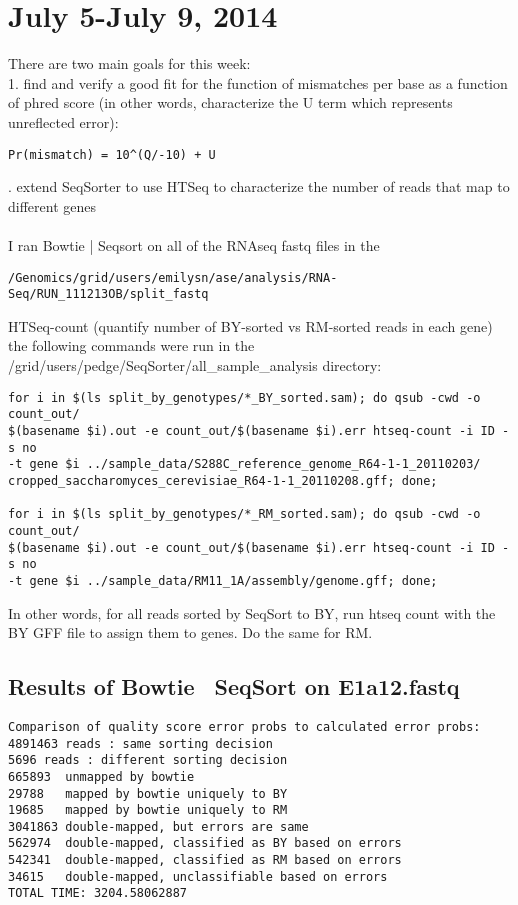 \documentclass[11pt]{article}
\begin{document}
\section*{July 5-July 9, 2014}
There are two main goals for this week: \\
1. find and verify a good fit for the function of mismatches per base as a function of phred score (in other words, characterize the U term which represents unreflected error):
\begin{verbatim}
Pr(mismatch) = 10^(Q/-10) + U
\end{verbatim}
. extend SeqSorter to use HTSeq to characterize the number of reads that map to different genes
\\
\smallskip
\\
\noindent
I ran Bowtie | Seqsort on all of the RNAseq fastq files in the
\begin{verbatim}
/Genomics/grid/users/emilysn/ase/analysis/RNA-Seq/RUN_111213OB/split_fastq
\end{verbatim}
HTSeq-count (quantify number of BY-sorted vs RM-sorted reads in each gene)\newline
the following commands were run in the /grid/users/pedge/SeqSorter/all\_sample\_analysis directory:
\begin{verbatim}
for i in $(ls split_by_genotypes/*_BY_sorted.sam); do qsub -cwd -o count_out/
$(basename $i).out -e count_out/$(basename $i).err htseq-count -i ID -s no
-t gene $i ../sample_data/S288C_reference_genome_R64-1-1_20110203/
cropped_saccharomyces_cerevisiae_R64-1-1_20110208.gff; done;

for i in $(ls split_by_genotypes/*_RM_sorted.sam); do qsub -cwd -o count_out/
$(basename $i).out -e count_out/$(basename $i).err htseq-count -i ID -s no
-t gene $i ../sample_data/RM11_1A/assembly/genome.gff; done;
\end{verbatim}
\noindent
In other words, for all reads sorted by SeqSort to BY, run htseq count with the BY GFF file to assign them to genes. Do the same for RM.
\noindent
\pagebreak
\subsection*{Results of Bowtie \textbar \ SeqSort on E1a12.fastq}
\begin{verbatim}
Comparison of quality score error probs to calculated error probs:
4891463 reads : same sorting decision
5696 reads : different sorting decision
665893	unmapped by bowtie
29788	mapped by bowtie uniquely to BY
19685	mapped by bowtie uniquely to RM
3041863	double-mapped, but errors are same
562974	double-mapped, classified as BY based on errors
542341	double-mapped, classified as RM based on errors
34615	double-mapped, unclassifiable based on errors
TOTAL TIME: 3204.58062887
\end{verbatim}
\end{document}
